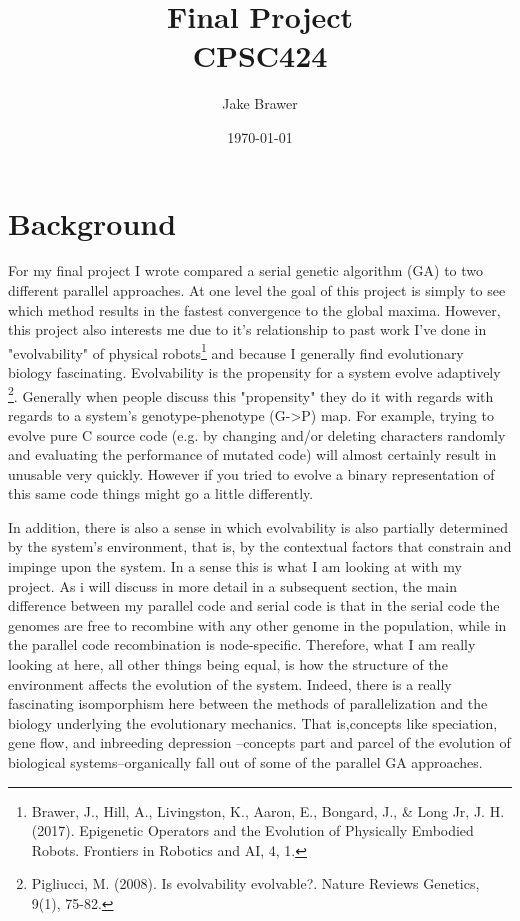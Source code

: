 \documentclass[11pt]{article}
\author{Jake Brawer}
\date{\today}
\title{Final Project\\\medskip
\large CPSC424}
\begin{document}
\maketitle

\section{Background}
\label{sec:orge55ad21}

For my final project I wrote compared a serial genetic algorithm (GA) to two different parallel approaches. At one level the goal of this project is simply to see which method results in the fastest convergence to the global maxima. However, this project also interests me due to it's relationship to past work I've done in "evolvability" of physical robots\footnote{Brawer, J., Hill, A., Livingston, K., Aaron, E., Bongard, J., \& Long Jr, J. H. (2017). Epigenetic Operators and the Evolution of Physically Embodied Robots. Frontiers in Robotics and AI, 4, 1.} and because I generally find evolutionary biology fascinating. Evolvability is the propensity for a system evolve adaptively \footnote{Pigliucci, M. (2008). Is evolvability evolvable?. Nature Reviews Genetics, 9(1), 75-82.}. Generally when people discuss this "propensity" they do it with regards with regards to a system's genotype-phenotype (G->P) map. For example, trying to evolve pure C source code (e.g. by changing and/or deleting characters randomly and evaluating the performance of mutated code) will almost certainly result in unusable very quickly. However if you tried to evolve a binary representation of this same code things might go a little differently. 

In addition, there is also a sense in which evolvability is also partially determined by the system's environment, that is, by the contextual factors that constrain and impinge upon the system. In a sense this is what I am looking at with my project. As i will discuss in more detail in a subsequent section, the main difference between my parallel code and serial code is that in the serial code the genomes are free to recombine with any other genome in the population, while in the parallel code recombination is node-specific. Therefore, what I am really looking at here, all other things being equal, is how the structure of the environment affects the evolution of the system. Indeed, there is a really fascinating isomporphism here between the methods of parallelization and the biology underlying the evolutionary mechanics. That is,concepts like speciation, gene flow, and inbreeding depression --concepts part and parcel of the evolution of biological systems--organically fall out of some of the parallel GA approaches.
\end{document}
